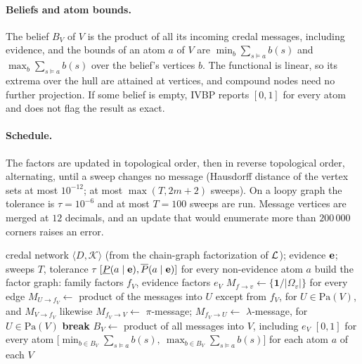 \documentclass{article} %
\providecommand{\Pa}{\mathrm{Pa}}
\begin{document}
\paragraph{Beliefs and atom bounds.}
The belief $B_V$ of $V$ is the product of all its incoming credal messages, including
evidence, and the bounds of an atom $a$ of $V$ are
$\min_{b}\sum_{s\models a}b(s)$ and $\max_{b}\sum_{s\models a}b(s)$ over the
belief's vertices $b$. The functional is linear, so its extrema over the hull are
attained at vertices, and compound nodes need no further projection. If some belief is
empty, IVBP reports $[0,1]$ for every atom and does not flag the result as exact.

\paragraph{Schedule.}
The factors are updated in topological order, then in reverse topological order,
alternating, until a sweep changes no message (Hausdorff distance of the vertex
sets at most $10^{-12}$; at most $\max(T,2m+2)$ sweeps). On a loopy graph the tolerance is
$\tau=10^{-6}$ and at most $T=100$ sweeps are run. Message vertices are merged at $12$
decimals, and an update that would enumerate more than $200\,000$ corners raises an error.

\begin{algorithm}[t]
\caption{Interval Belief Propagation (IVBP)}
\label{alg:ibp}
\begin{algorithmic}[1]
\Require credal network $\langle D,\mathcal K\rangle$ (from the chain-graph
         factorization of $\mathcal{L}$); evidence $\mathbf{e}$; sweeps $T$, tolerance $\tau$
\Ensure $[\underline P(a\mid\mathbf{e}),\overline P(a\mid\mathbf{e})]$ for every non-evidence atom $a$
\State build the factor graph: family factors $f_V$, evidence factors $e_V$
\State $M_{f\to v}\gets\{\mathbf 1/|\Omega_v|\}$ for every edge
    \State $M_{U\to f_V}\gets$ product of the messages into $U$ except from $f_V$,
           for $U\in\Pa(V)$, and $M_{V\to f_V}$ likewise
    \State $M_{f_V\to V}\gets$ $\pi$-message; $M_{f_V\to U}\gets$ $\lambda$-message,
           for $U\in\Pa(V)$
  \EndFor
    \State \textbf{break}
  \EndIf
\EndFor
\State $B_V\gets$ product of all messages into $V$, including $e_V$
  \State \Return $[0,1]$ for every atom
\EndIf
\State \Return $\bigl[\min_{b\in B_V}\sum_{s\models a}b(s),\ \max_{b\in B_V}\sum_{s\models a}b(s)\bigr]$
       for each atom $a$ of each $V$
\end{algorithmic}
\end{algorithm}
\end{document}
